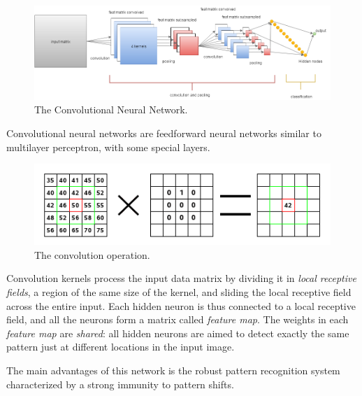 \begin{enumerate}
\begin{figure}
	 \centering
	 \includegraphics[width=0.9\columnwidth]{img/CNN}
	 \caption{The Convolutional Neural Network.}
	\end{figure}


Convolutional neural networks are feedforward neural networks similar to multilayer perceptron, with some special layers.


\begin{figure}[t]
		\centering
		\includegraphics[width=0.7\columnwidth]{img/convolution-calculate}
		\caption{The convolution operation.}
	\end{figure}
	


Convolution kernels process the input data matrix by dividing it in \textit{local receptive fields}, a region of the same size of the kernel, and sliding the local receptive field across the entire input.
Each hidden neuron is thus connected to a local receptive field, and all the neurons form a matrix called \textit{feature map}.
The weights in each \textit{feature map} are \textit{shared}: all hidden neurons are aimed to detect exactly the same pattern just at different locations in the input image. 

The main advantages of this network is the robust pattern recognition system characterized by a strong immunity to pattern shifts.


\end{enumerate}
